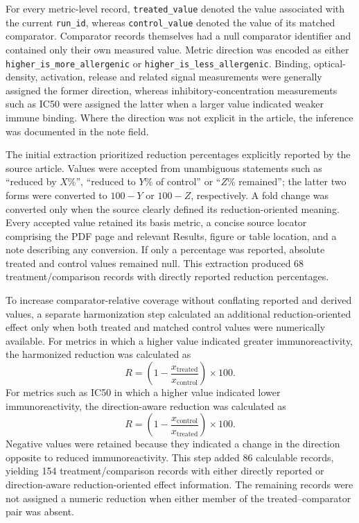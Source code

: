 For every metric-level record, \texttt{treated\_value} denoted the value associated
with the current \texttt{run\_id}, whereas \texttt{control\_value} denoted the value
of its matched comparator. Comparator records themselves had a null comparator
identifier and contained only their own measured value. Metric direction was encoded
as either \texttt{higher\_is\_more\_allergenic} or
\texttt{higher\_is\_less\_allergenic}. Binding, optical-density, activation,
release and related signal measurements were generally assigned the former
direction, whereas inhibitory-concentration measurements such as IC50 were assigned
the latter when a larger value indicated weaker immune binding. Where the direction
was not explicit in the article, the inference was documented in the note field.

The initial extraction prioritized reduction percentages explicitly reported by
the source article. Values were accepted from unambiguous statements such as
``reduced by $X$\%'', ``reduced to $Y$\% of control'' or ``$Z$\% remained''; the
latter two forms were converted to $100-Y$ or $100-Z$, respectively. A fold change
was converted only when the source clearly defined its reduction-oriented meaning.
Every accepted value retained its basis metric, a concise source locator comprising
the PDF page and relevant Results, figure or table location, and a note describing
any conversion. If only a percentage was reported, absolute treated and control
values remained null. This extraction produced 68 treatment/comparison records with
directly reported reduction percentages.

To increase comparator-relative coverage without conflating reported and derived
values, a separate harmonization step calculated an additional reduction-oriented
effect only when both treated and matched control values were numerically available.
For metrics in which a higher value indicated greater immunoreactivity, the
harmonized reduction was calculated as
\[
R = \left(1-\frac{x_{\mathrm{treated}}}{x_{\mathrm{control}}}\right)\times100.
\]
For metrics such as IC50 in which a higher value indicated lower immunoreactivity,
the direction-aware reduction was calculated as
\[
R = \left(1-\frac{x_{\mathrm{control}}}{x_{\mathrm{treated}}}\right)\times100.
\]
Negative values were retained because they indicated a change in the direction
opposite to reduced immunoreactivity. This step added 86 calculable records, yielding
154 treatment/comparison records with either directly reported or direction-aware
reduction-oriented effect information. The remaining records were not assigned a
numeric reduction when either member of the treated--comparator pair was absent.

